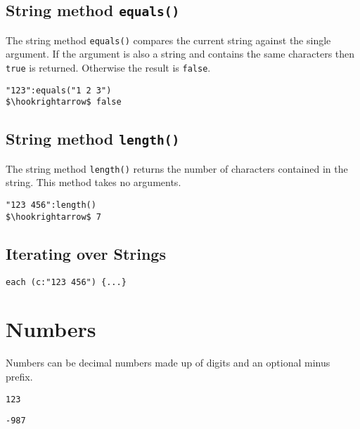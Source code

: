 \documentclass[11pt,a4paper]{scrbook}
\begin{document}
\subsection{String method \texttt{equals()}}

The string method \texttt{equals()} compares the current string against the
single argument. If the argument is also a string and contains the same
characters then \verb|true| is returned. Otherwise the result is \verb|false|.

\begin{lstlisting}[language=BibTool,mathescape=true]
"123":equals("1 2 3")
$\hookrightarrow$ false
\end{lstlisting}

\subsection{String method \texttt{length()}}

The string method \texttt{length()} returns the number of characters contained
in the string. This method takes no arguments.

\begin{lstlisting}[language=BibTool,mathescape=true]
"123 456":length()
$\hookrightarrow$ 7
\end{lstlisting}


\subsection{Iterating over Strings}


\begin{lstlisting}[language=BibTool,mathescape=true]
each (c:"123 456") {...}
\end{lstlisting}

\section{Numbers}

Numbers can be decimal numbers made up of digits and an optional minus prefix.

\begin{lstlisting}[language=BibTool]
123
\end{lstlisting}

\begin{lstlisting}[language=BibTool]
-987
\end{lstlisting}
\end{document}
